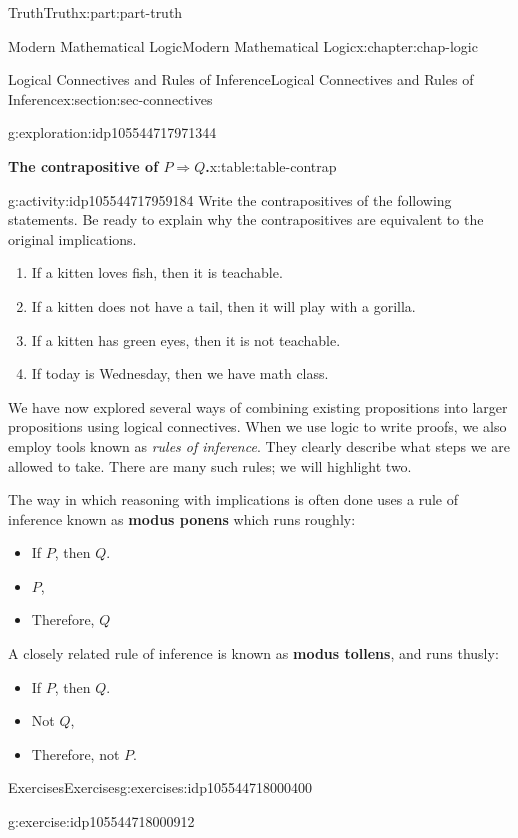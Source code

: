 \documentclass[oneside,10pt,]{book}
\newcommand{\terminology}[1]{\textbf{#1}}
\numberwithin{equation}{section}
\begin{document}
\begin{partptx}{Truth}{}{Truth}{}{}{x:part:part-truth}
\begin{chapterptx}{Modern Mathematical Logic}{}{Modern Mathematical Logic}{}{}{x:chapter:chap-logic}
\begin{sectionptx}{Logical Connectives and Rules of Inference}{}{Logical Connectives and Rules of Inference}{}{}{x:section:sec-connectives}
\begin{exploration}{}{g:exploration:idp105544717971344}
\begin{tableptx}{\textbf{The contrapositive of \(P\Rightarrow Q\).}}{x:table:table-contrap}{}
\end{tableptx}%
\end{exploration}%
\begin{activity}{}{g:activity:idp105544717959184}%
Write the contrapositives of the following statements. Be ready to explain why the contrapositives are equivalent to the original implications.%
%
\begin{enumerate}
\item{}If a kitten loves fish, then it is teachable.%
\item{}If a kitten does not have a tail, then it will play with a gorilla.%
\item{}If a kitten has green eyes, then it is not teachable.%
\item{}If today is Wednesday, then we have math class.%
\end{enumerate}
\end{activity}%
We have now explored several ways of combining existing propositions into larger propositions using logical connectives. When we use logic to write proofs, we also employ tools known as \emph{rules of inference}. They clearly describe what steps we are allowed to take. There are many such rules; we will highlight two.%
\par
The way in which reasoning with implications is often done uses a rule of inference known as \terminology{modus ponens} which runs roughly:%
%
\begin{itemize}[label=\textbullet]
\item{}If \(P\), then \(Q\).%
\item{}\(P\),%
\item{}Therefore, \(Q\)%
\end{itemize}
A closely related rule of inference is known as \terminology{modus tollens}, and runs thusly:%
%
\begin{itemize}[label=\textbullet]
\item{}If \(P\), then \(Q\).%
\item{}Not \(Q\),%
\item{}Therefore, not \(P\).%
\end{itemize}
%
%
\typeout{************************************************}
\typeout{************************************************}
%
\begin{exercises-subsection-numberless}{Exercises}{}{Exercises}{}{}{g:exercises:idp105544718000400}
\begin{divisionexercise}{1}{}{}{g:exercise:idp105544718000912}%
%
\end{divisionexercise}%

\end{exercises-subsection-numberless}
\end{sectionptx}
\end{chapterptx}
\end{partptx}
\end{document}
